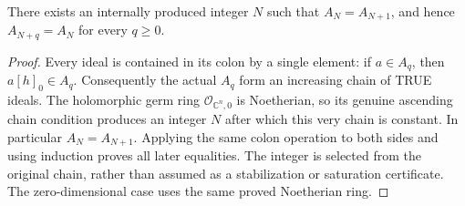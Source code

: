 \begin{lemma}
\label{hir:relative-normal-coherent-saturation-origin-stability}
\leanok
{}
There exists an internally produced integer $N$ such that
$A_N=A_{N+1}$, and hence $A_{N+q}=A_N$ for every $q\geq0$.
\end{lemma}
\begin{proof}
Every ideal is contained in its colon by a single element: if
$a\in A_q$, then $a[h]_0\in A_q$. Consequently the actual $A_q$
form an increasing chain of TRUE ideals. The holomorphic germ ring
$\mathcal O_{\mathbb C^n,0}$ is Noetherian, so its genuine ascending
chain condition produces an integer $N$ after which this very chain
is constant. In particular $A_N=A_{N+1}$. Applying the same colon
operation to both sides and using induction proves all later
equalities. The integer is selected from the original chain, rather
than assumed as a stabilization or saturation certificate. The
zero-dimensional case uses the same proved Noetherian ring.
\end{proof}

